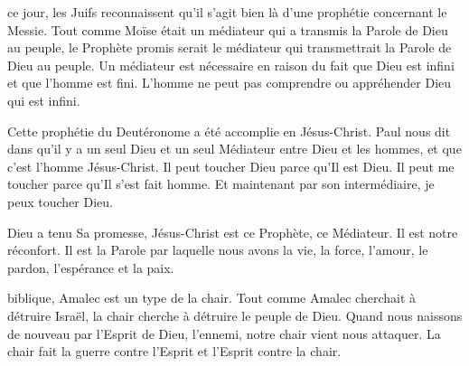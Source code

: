  ce jour, les Juifs reconnaissent
 qu'il s'agit bien là d'une prophétie concernant le Messie.
 Tout comme Moïse était un médiateur qui a transmis la Parole de Dieu au peuple,
 le Prophète promis serait le médiateur qui transmettrait la Parole de Dieu
 au peuple.
 Un médiateur est nécessaire en raison du fait que Dieu est infini
 et que l'homme est fini.
 L'homme ne peut pas comprendre ou appréhender Dieu qui est infini.


Cette prophétie du Deutéronome a été accomplie en Jésus-Christ.
 Paul nous dit dans  qu'il y a un seul Dieu
 et un seul Médiateur entre Dieu et les hommes,
 et que c'est l'homme Jésus-Christ. Il peut toucher Dieu parce qu'Il est Dieu.
 Il peut me toucher parce qu'Il s'est fait homme.
 Et maintenant par son intermédiaire, je peux toucher Dieu.

Dieu a tenu Sa promesse, Jésus-Christ est ce Prophète, ce Médiateur.
 Il est notre réconfort. Il est la Parole par laquelle nous avons la vie,
 la force, l'amour, le pardon, l'espérance et la paix. 

\dvrule






 biblique, Amalec est un type
  de la chair.
 Tout comme Amalec cherchait à détruire Israël,
 la chair cherche à détruire le peuple de Dieu.
 Quand nous naissons de nouveau par l'Esprit de Dieu, l'ennemi,
 notre chair vient nous attaquer.
 La chair fait la guerre contre l'Esprit et l'Esprit contre la chair.

